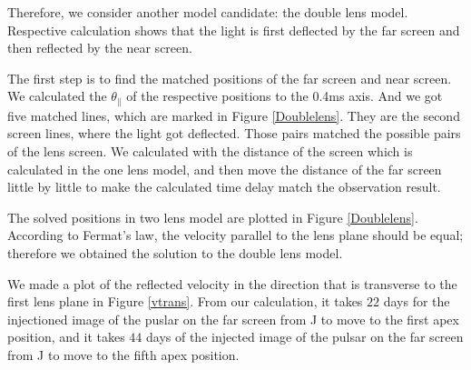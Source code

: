 \documentclass[useAMS,usenatbib]{mn2e}
\begin{document}
Therefore, we consider another model candidate: the double lens model. Respective calculation shows that the light is first deflected by the far screen and then reflected by the near screen. 

The first step is to find the matched positions of the far screen and near screen. We calculated the $\theta_{\parallel}$ of the respective positions to the 0.4ms axis. And we got five matched lines, which are marked in Figure \ref{Doublelens}. They are the second screen lines, where the light got deflected. Those pairs matched the possible pairs of the lens screen. We calculated with the distance of the screen which is calculated in the one lens model, and then move the distance of the far screen little by little to make the calculated time delay match the observation result.

The solved positions in two lens model are plotted in Figure \ref{Doublelens}. According to Fermat's law, the velocity parallel to the lens plane should be equal; therefore we obtained the solution to the double lens model. 

We made a plot of the reflected velocity in the direction that is transverse to the first lens plane in Figure \ref{vtrans}.
From our calculation, it takes $22$ days for the injectioned image of the puslar on the far screen from J to move to the first apex position, and it takes $44$ days of the injected image of the pulsar on the far screen from J to move to the fifth apex position.


\end{document}
